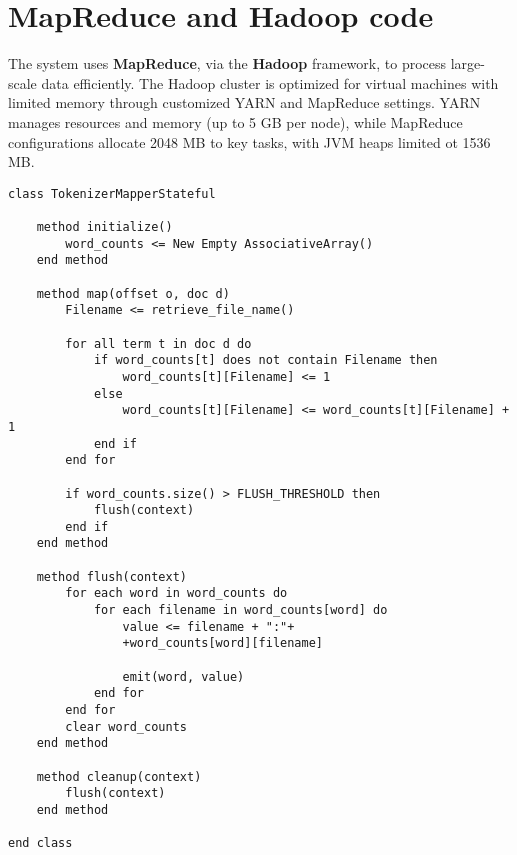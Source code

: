 \section{MapReduce and Hadoop code}
The system uses \textbf{MapReduce}, via the \textbf{Hadoop} framework, to process large-scale data efficiently. The Hadoop cluster is optimized for virtual machines with limited memory through customized YARN and MapReduce settings. YARN manages resources and memory (up to 5 GB per node), while MapReduce configurations allocate 2048 MB to key tasks, with JVM heaps limited ot 1536 MB.

\newpage 

\begin{center}
	\begin{minipage}{0.9\linewidth}
		\begin{lstlisting}[language=PseudoCode]
class TokenizerMapperStateful

	method initialize()
		word_counts <= New Empty AssociativeArray()
	end method
	
	method map(offset o, doc d)
		Filename <= retrieve_file_name()
		
		for all term t in doc d do
			if word_counts[t] does not contain Filename then
				word_counts[t][Filename] <= 1
			else
				word_counts[t][Filename] <= word_counts[t][Filename] + 1
			end if
		end for
		
		if word_counts.size() > FLUSH_THRESHOLD then
			flush(context)
		end if
	end method
	
	method flush(context)
		for each word in word_counts do
			for each filename in word_counts[word] do
				value <= filename + ":"+ 
				+word_counts[word][filename]
				
				emit(word, value)
			end for
		end for
		clear word_counts
	end method
	
	method cleanup(context)
		flush(context)
	end method

end class
		\end{lstlisting}
		\label{fig:pseudocode-stateful-mapper}
	\end{minipage}
\end{center}
